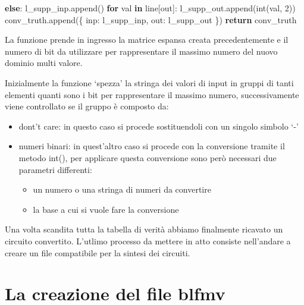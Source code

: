 \documentclass[
  italian,
]{book}
\newenvironment{Shaded}{\begin{snugshade}}{\end{snugshade}}
\newcommand{\BuiltInTok}[1]{#1}
\newcommand{\ControlFlowTok}[1]{\textcolor[rgb]{0.13,0.29,0.53}{\textbf{#1}}}
\newcommand{\DecValTok}[1]{\textcolor[rgb]{0.00,0.00,0.81}{#1}}
\newcommand{\KeywordTok}[1]{\textcolor[rgb]{0.13,0.29,0.53}{\textbf{#1}}}
\newcommand{\NormalTok}[1]{#1}
\newcommand{\StringTok}[1]{\textcolor[rgb]{0.31,0.60,0.02}{#1}}
\providecommand{\tightlist}{%
  \setlength{\itemsep}{0pt}\setlength{\parskip}{0pt}}
\begin{document}
\begin{Shaded}
\begin{Highlighting}[]
        \ControlFlowTok{else}\NormalTok{:}
\NormalTok{          l\_supp\_inp.append(}\StringTok{\textquotesingle{}{-}\textquotesingle{}}\NormalTok{)}
      \ControlFlowTok{for}\NormalTok{ val }\KeywordTok{in}\NormalTok{ line[}\StringTok{\textquotesingle{}out\textquotesingle{}}\NormalTok{]:}
\NormalTok{        l\_supp\_out.append(}\BuiltInTok{int}\NormalTok{(val, }\DecValTok{2}\NormalTok{))}
\NormalTok{      conv\_truth.append(\{}
        \StringTok{\textquotesingle{}inp\textquotesingle{}}\NormalTok{:  l\_supp\_inp,}
        \StringTok{\textquotesingle{}out\textquotesingle{}}\NormalTok{:  l\_supp\_out}
\NormalTok{      \})}
  \ControlFlowTok{return}\NormalTok{ conv\_truth}
\end{Highlighting}
\end{Shaded}

La funzione prende in ingresso la matrice espansa creata precedentemente e il numero di bit da utilizzare per rappresentare il massimo numero del nuovo dominio multi valore.

\newpage

Inizialmente la funzione `spezza' la stringa dei valori di input in gruppi di tanti elementi quanti sono i bit per rappresentare il massimo numero, successivamente viene controllato se il gruppo è composto da:

\begin{itemize}
\tightlist
\item
  dont't care: in questo caso si procede sostituendoli con un singolo simbolo `-'
\item
  numeri binari: in quest'altro caso si procede con la conversione tramite il metodo int(), per applicare questa conversione sono però necessari due parametri differenti:

  \begin{itemize}
  \tightlist
  \item
    un numero o una stringa di numeri da convertire
  \item
    la base a cui si vuole fare la conversione
  \end{itemize}
\end{itemize}

Una volta scandita tutta la tabella di verità abbiamo finalmente ricavato un circuito convertito. L'utlimo processo da mettere in atto consiste nell'andare a creare un file compatibile per la sintesi dei circuiti.

\hypertarget{la-creazione-del-file-blfmv}{%
\section{La creazione del file blfmv}\label{la-creazione-del-file-blfmv}}
\end{document}
